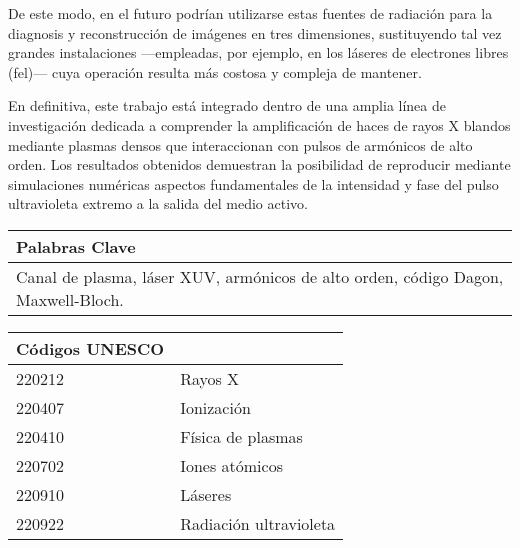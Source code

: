 De este modo, en el futuro podrían utilizarse estas fuentes de radiación para la diagnosis y reconstrucción de imágenes en tres dimensiones, sustituyendo tal vez grandes instalaciones ---empleadas, por ejemplo, en los láseres de electrones libres (\acrshort{fel})--- cuya operación resulta más costosa y compleja de mantener. 

En definitiva, este trabajo está integrado dentro de una amplia línea de investigación dedicada a comprender la amplificación de haces de rayos X blandos mediante plasmas densos que interaccionan con pulsos de armónicos de alto orden. Los resultados obtenidos demuestran la posibilidad de reproducir mediante simulaciones numéricas aspectos fundamentales de la intensidad y fase del pulso ultravioleta extremo a la salida del medio activo. 

\begin{table}[htpb]
    \begin{tabular}{l}
        \textbf{Palabras Clave} \\
        \midrule
         Canal de plasma, láser XUV, armónicos de alto orden, código Dagon, Maxwell-Bloch. 
    \end{tabular}
\end{table}

\begin{table}[htpb]
    \begin{tabular}{ll}
        \textbf{Códigos UNESCO} & \\
        \midrule
         220212 & Rayos X \\
         220407 & Ionización \\
         220410 & Física de plasmas \\
         220702 & Iones atómicos \\
         220910 & Láseres \\
         220922 & Radiación ultravioleta 
    \end{tabular}
\end{table}
